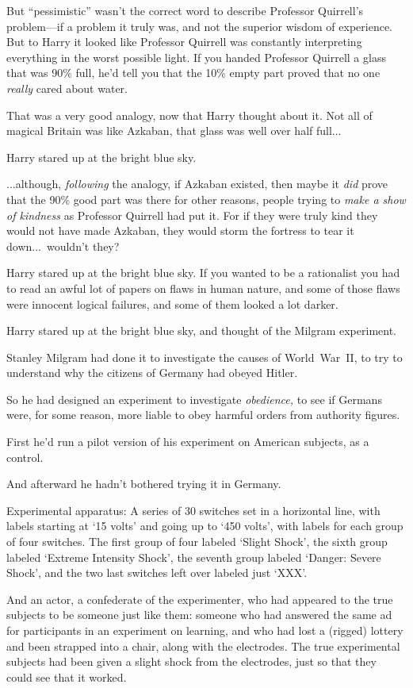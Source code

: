 But “pessimistic” wasn’t the correct word to describe Professor Quirrell’s problem—if a problem it truly was, and not the superior wisdom of experience. But to Harry it looked like Professor Quirrell was constantly interpreting everything in the worst possible light. If you handed Professor Quirrell a glass that was 90\% full, he’d tell you that the 10\% empty part proved that no one \emph{really} cared about water.

That was a very good analogy, now that Harry thought about it. Not all of magical Britain was like Azkaban, that glass was well over half full...

Harry stared up at the bright blue sky.

...although, \emph{following} the analogy, if Azkaban existed, then maybe it \emph{did} prove that the 90\% good part was there for other reasons, people trying to \emph{make a show of kindness} as Professor Quirrell had put it. For if they were truly kind they would not have made Azkaban, they would storm the fortress to tear it down...\ wouldn’t they?

Harry stared up at the bright blue sky. If you wanted to be a rationalist you had to read an awful lot of papers on flaws in human nature, and some of those flaws were innocent logical failures, and some of them looked a lot darker.

Harry stared up at the bright blue sky, and thought of the Milgram experiment.

Stanley Milgram had done it to investigate the causes of World~War~II, to try to understand why the citizens of Germany had obeyed Hitler.

So he had designed an experiment to investigate \emph{obedience,} to see if Germans were, for some reason, more liable to obey harmful orders from authority figures.

First he’d run a pilot version of his experiment on American subjects, as a control.

And afterward he hadn’t bothered trying it in Germany.

Experimental apparatus: A series of 30 switches set in a horizontal line, with labels starting at ‘15 volts’ and going up to ‘450 volts’, with labels for each group of four switches. The first group of four labeled ‘Slight Shock’, the sixth group labeled ‘Extreme Intensity Shock’, the seventh group labeled ‘Danger: Severe Shock’, and the two last switches left over labeled just ‘XXX’.

And an actor, a confederate of the experimenter, who had appeared to the true subjects to be someone just like them: someone who had answered the same ad for participants in an experiment on learning, and who had lost a (rigged) lottery and been strapped into a chair, along with the electrodes. The true experimental subjects had been given a slight shock from the electrodes, just so that they could see that it worked.

